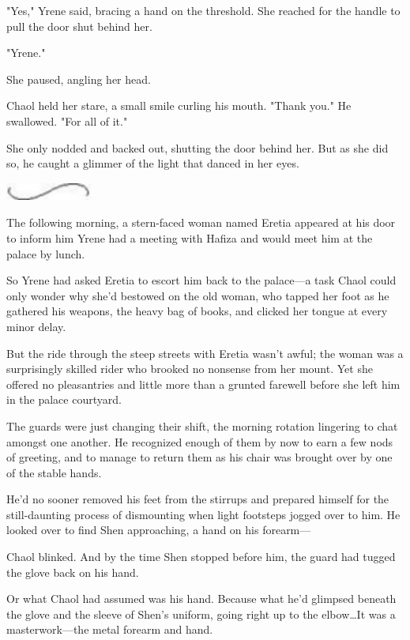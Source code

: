 "Yes," Yrene said, bracing a hand on the threshold.
She reached for the handle to pull the door shut behind her.

"Yrene."

She paused, angling her head.

Chaol held her stare, a small smile curling his mouth.
"Thank you."
He swallowed.
"For all of it."

She only nodded and backed out, shutting the door behind her.
But as she did so, he caught a glimmer of the light that danced in her eyes.

\begin{center}
	\includegraphics[width=1.12in,height=0.24in]{images/seperator}
\end{center}

The following morning, a stern-faced woman named Eretia appeared at his door to inform him Yrene had a meeting with Hafiza and would meet him at the palace by lunch.

So Yrene had asked Eretia to escort him back to the palace---a task Chaol could only wonder why she'd bestowed on the old woman, who tapped her foot as he gathered his weapons, the heavy bag of books, and clicked her tongue at every minor delay.

But the ride through the steep streets with Eretia wasn't awful; the woman was a surprisingly skilled rider who brooked no nonsense from her mount.
Yet she offered no pleasantries and little more than a grunted farewell before she left him in the palace courtyard.

The guards were just changing their shift, the morning rotation lingering to chat amongst one another.
He recognized enough of them by now to earn a few nods of greeting, and to manage to return them as his chair was brought over by one of the stable hands.

He'd no sooner removed his feet from the stirrups and prepared himself for the still-daunting process of dismounting when light footsteps jogged over to him.
He looked over to find Shen approaching, a hand on his forearm---

Chaol blinked.
And by the time Shen stopped before him, the guard had tugged the glove back on his hand.

Or what Chaol had assumed was his hand.
Because what he'd glimpsed beneath the glove and the sleeve of Shen's uniform, going right up to the elbow\ldots It was a masterwork---the metal forearm and hand.

